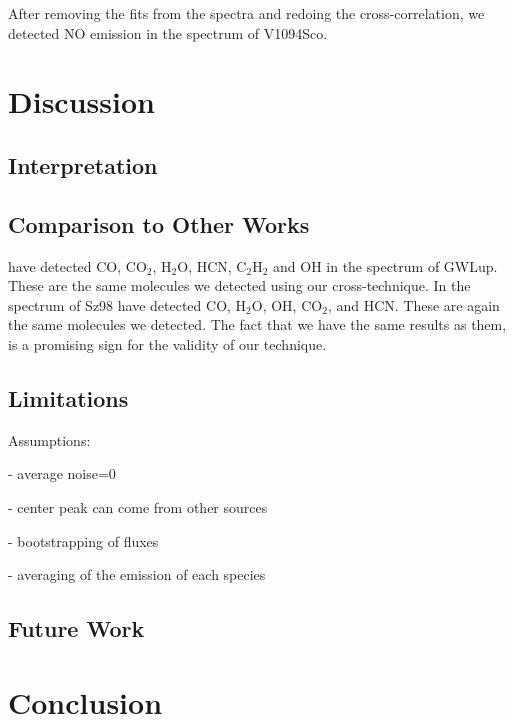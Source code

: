 \documentclass[oneside, single, authoryear, semicolon]{lion-msc}
\newcommand{\4}{$_4$}
\newcommand{\3}{$_3$}
\newcommand{\2}{$_2$}
\begin{document}
After removing the fits from the spectra and redoing the cross-correlation, we detected NO emission in the spectrum of V1094Sco.

\chapter{Discussion}\label{Ch: Discussion}
\section{Interpretation}
\section{Comparison to Other Works}
\cite{Grant_2023} have detected CO, CO\2, H\2O, HCN, C\2H\2 and OH in the spectrum of GWLup. These are the same molecules we detected using our cross-technique. In the spectrum of Sz98 \cite{Gasman_2023} have detected CO, H\2O, OH, CO\2, and HCN. These are again the same molecules we detected. The fact that we have the same results as them, is a promising sign for the validity of our technique. 
\section{Limitations}
Assumptions:

- average noise=0

- center peak can come from other sources

- bootstrapping of fluxes

- averaging of the emission of each species

\section{Future Work}


\chapter{Conclusion}\label{Ch: Conclusion}



\end{document}
